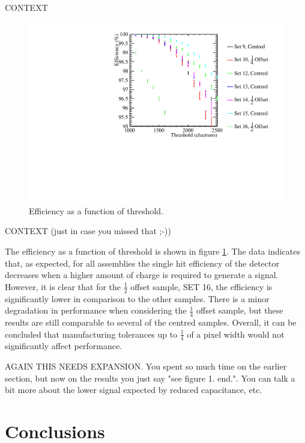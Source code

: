 CONTEXT

\begin{figure}
\centering
\includegraphics[width=1.0\textwidth]{CLICdpVertex/Plots/TestBeamData/EfficiencyThresholdPlot.pdf}
\caption[Efficiency as a function of threshold.]{Efficiency as a function of threshold.}
\label{fig:efficiency}
\end{figure}

CONTEXT (just in case you missed that ;-))

The efficiency as a function of threshold is shown in figure \ref{fig:efficiency}.  The data indicates that, as expected, for all assemblies the single hit efficiency of the detector decreases when a higher amount of charge is required to generate a signal.  However, it is clear that for the $\frac{1}{2}$ offset sample, SET 16, the efficiency is significantly lower in comparison to the other samples. There is a minor degradation in performance when considering the $\frac{1}{4}$ offset sample, but these results are still comparable to several of the centred samples.  Overall, it can be concluded that manufacturing tolerances up to $\frac{1}{4}$ of a pixel width would not significantly affect performance.    

AGAIN THIS NEEDS EXPANSION. You spent so much time on the earlier section, but now on the results you just say "see figure 1. end.". You can talk a bit more about the lower signal expected by reduced capacitance, etc.


\section{Conclusions}



  
